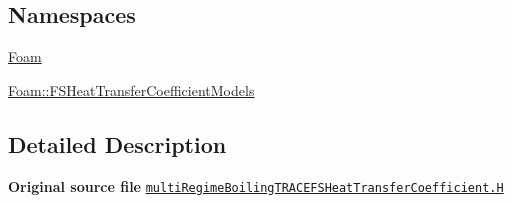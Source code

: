 \subsection*{Namespaces}
\begin{DoxyCompactItemize}
\item 
 \hyperlink{namespaceFoam}{Foam}
\item 
 \hyperlink{namespaceFoam_1_1FSHeatTransferCoefficientModels}{Foam\+::\+F\+S\+Heat\+Transfer\+Coefficient\+Models}
\end{DoxyCompactItemize}


\subsection{Detailed Description}
{\bfseries Original source file} \href{../../../home/carlo/data/GeN-Foam/GeN-Foam_ffn/GeN-Foam/GeN-Foam/classes/thermalHydraulics/src/physicsModels/heatTransferModels/FSHeatTransferCoefficientModels/multiRegimeBoilingTRACE/multiRegimeBoilingTRACEFSHeatTransferCoefficient.H}{\tt multi\+Regime\+Boiling\+T\+R\+A\+C\+E\+F\+S\+Heat\+Transfer\+Coefficient.\+H} 
